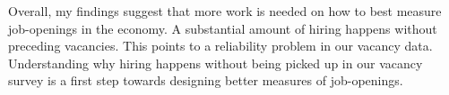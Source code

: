Overall, my findings suggest that more work is needed on how to best measure job-openings in the economy. A substantial amount of hiring happens without preceding vacancies. This points to a reliability problem in our vacancy data. Understanding why hiring happens without being picked up in our vacancy survey is a first step towards designing better measures of job-openings.
